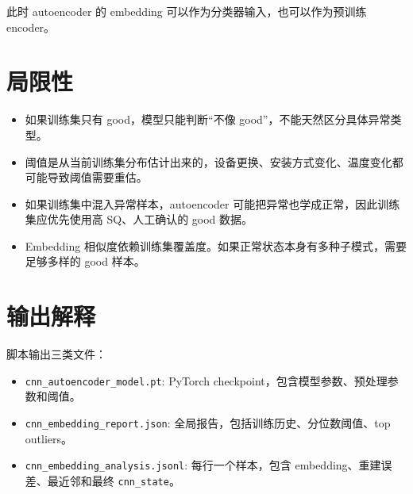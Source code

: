 \documentclass[UTF8,fontset=fandol]{ctexart}
\begin{document}
此时 autoencoder 的 embedding 可以作为分类器输入，也可以作为预训练 encoder。

\section{局限性}

\begin{itemize}
  \item 如果训练集只有 good，模型只能判断``不像 good''，不能天然区分具体异常类型。
  \item 阈值是从当前训练集分布估计出来的，设备更换、安装方式变化、温度变化都可能导致阈值需要重估。
  \item 如果训练集中混入异常样本，autoencoder 可能把异常也学成正常，因此训练集应优先使用高 SQ、人工确认的 good 数据。
  \item Embedding 相似度依赖训练集覆盖度。如果正常状态本身有多种子模式，需要足够多样的 good 样本。
\end{itemize}

\section{输出解释}

脚本输出三类文件：

\begin{itemize}
  \item \texttt{cnn\_autoencoder\_model.pt}: PyTorch checkpoint，包含模型参数、预处理参数和阈值。
  \item \texttt{cnn\_embedding\_report.json}: 全局报告，包括训练历史、分位数阈值、top outliers。
  \item \texttt{cnn\_embedding\_analysis.jsonl}: 每行一个样本，包含 embedding、重建误差、最近邻和最终 \texttt{cnn\_state}。
\end{itemize}
\end{document}
